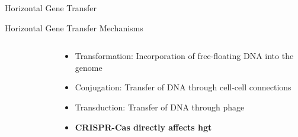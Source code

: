\documentclass[dvipsnames]{beamer}
\begin{document}
\begin{frame}{}%
    \begin{center}
        \Huge \textcolor{OliveGreen}{Horizontal Gene Transfer}
    \end{center}
    \addtocounter{framenumber}{-1}
\end{frame}
\begin{frame}[fragile]{Horizontal Gene Transfer Mechanisms}
    \begin{columns}
    \begin{column}{0.5\textwidth}
        \begin{figure}[htb!]
            \autocite{trendslgt}
        \end{figure}
    \end{column}
    \begin{column}{0.5\textwidth}
        \begin{itemize}
            \item<2-> Transformation: Incorporation of free-floating DNA into the genome \autocite{trendslgt}
            \item<3-> Conjugation: Transfer of DNA through cell-cell connections \autocite{trendslgt}
            \item<4-> Transduction: Transfer of DNA through phage \autocite{trendslgt}
            \item<5-> \textbf{CRISPR-Cas directly affects \ac{hgt}} \autocite{trendslgt}
        \end{itemize}
    \end{column}
    \end{columns}
\end{frame}
\end{document}
